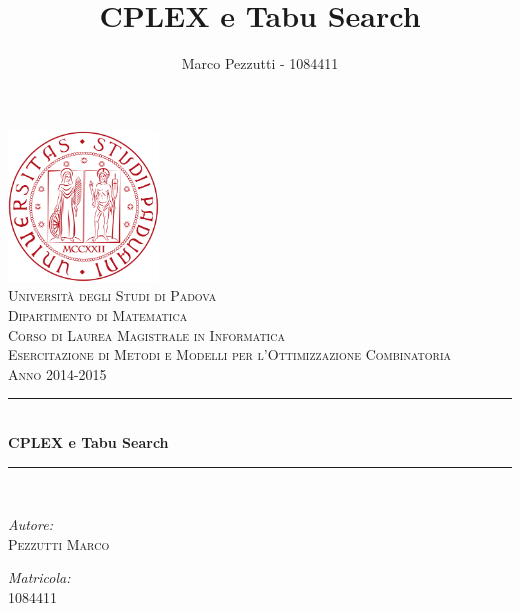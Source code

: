 \documentclass[11pt,a4paper,final]{article}
\author{Marco Pezzutti - 1084411}
\title{CPLEX e Tabu Search}
\date{}
\begin{document}
\begin{titlepage}
\begin{center}
\includegraphics[width=40mm]{immagini/Logo_Padova.png}\\[1cm]
\textcolor{redUni}{\textsc{\LARGE Università degli Studi di Padova}}\\[0.5cm]
\textcolor{redUni}{\textsc{\Large Dipartimento di Matematica}}\\[0.5cm]
\textcolor{redUni}{\textsc{\Large Corso di Laurea Magistrale in Informatica}}\\[2cm]
\textsc{\Large Esercitazione di Metodi e Modelli per l'Ottimizzazione Combinatoria}\\[0.5cm]
\textsc{\large Anno 2014-2015} \\[1cm]
\rule{\linewidth}{0.3mm}\\[0.5cm]
{\huge \bfseries CPLEX e Tabu Search}\\[0.3cm]
\rule{\linewidth}{0.3mm}\\[1cm]
\begin{minipage}{0.4\textwidth}
	\begin{flushleft}
	\emph{Autore:}\\
	\textsc{\large Pezzutti Marco}\\
	\end{flushleft}
\end{minipage}
\begin{minipage}{0.4\textwidth}
	\begin{flushright}
	\emph{Matricola:}\\
	\textsc{\large 1084411}\\
	\end{flushright}
\end{minipage}
\end{center}
\end{titlepage}

\tableofcontents
\listoffigures
\listoftables
\newpage

%






\appendix

\end{document}
